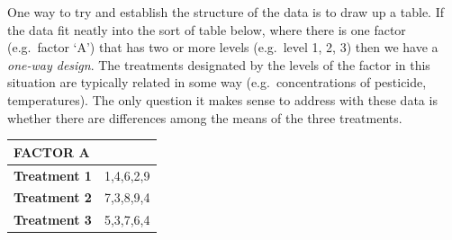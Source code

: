 \documentclass[
]{book}
\begin{document}
One way to try and establish the structure of the data is to draw up a table. If the data fit neatly into the sort of table below, where there is one factor (e.g.~factor `A') that has two or more levels (e.g.~level 1, 2, 3) then we have a \emph{one-way design}. The treatments designated by the levels of the factor in this situation are typically related in some way (e.g.~concentrations of pesticide, temperatures). The only question it makes sense to address with these data is whether there are differences among the means of the three treatments.

\begin{longtable}[]{@{}lc@{}}
\toprule()
\textbf{FACTOR A} & \\
\midrule()
\endhead
\textbf{Treatment 1} & 1,4,6,2,9 \\
\textbf{Treatment 2} & 7,3,8,9,4 \\
\textbf{Treatment 3} & 5,3,7,6,4 \\
\bottomrule()
\end{longtable}
\end{document}
